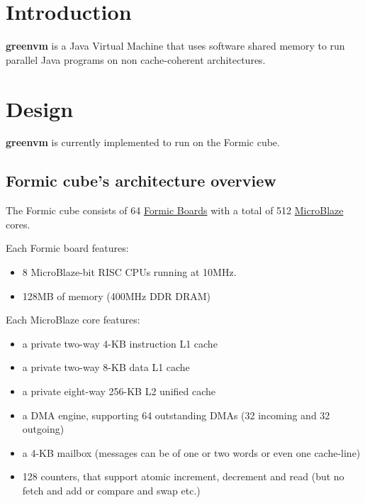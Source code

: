 \documentclass[
a4paper,
12pt,
]{report}
\newcommand{\gvm}{{\fontfamily{fco}\selectfont\textbf{\color{g}green\color{v}vm}}\xspace}
\newcommand{\mblaze}{MicroBlaze\texttrademark\xspace}
\newcommand{\java}{Java\texttrademark\xspace}
\begin{document}

\pagestyle{plain}
\listoftodos
\newpage
\tableofcontents
\newpage
\thispagestyle{empty}
\pagestyle{headings}

\chapter*{Introduction}

\gvm is a \java Virtual Machine that uses software shared memory to run
parallel \java programs on non cache-coherent architectures.

\chapter{Design}

\gvm is currently implemented to run on the Formic cube.

\section{Formic cube's architecture overview}

The Formic cube consists of 64
\href{http://www.formic-board.com/}{Formic Boards} with a total of 512
\href{http://www.xilinx.com/tools/microblaze.htm}{\mblaze} cores.

Each Formic board features:
\begin{itemize}
\item 8 \mblaze 32-bit RISC CPUs running at 10MHz.
\item 128MB of memory (400MHz DDR DRAM)
\end{itemize}

Each \mblaze core features:
\begin{itemize}
\item a private two-way 4-KB instruction L1 cache
\item a private two-way 8-KB data L1 cache
\item a private eight-way 256-KB L2 unified cache
\item a DMA engine, supporting 64 outstanding DMAs (32 incoming and 32 outgoing)
\item a 4-KB mailbox (messages can be of one or two words or even one cache-line)
\item 128 counters, that support atomic increment, decrement and read
  (but no fetch and add or compare and swap etc.)
\end{itemize}
\end{document}
